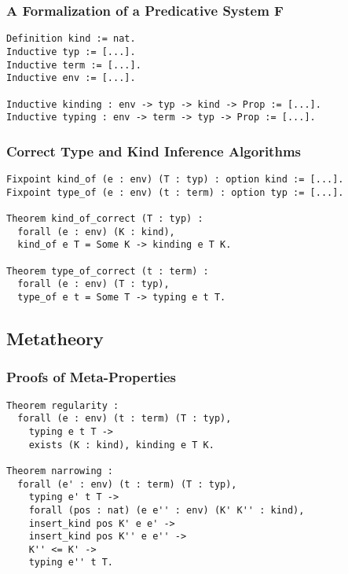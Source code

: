 \documentclass{beamer}
\begin{document}
\begin{frame}[fragile]

  \frametitle{A Formalization of a Predicative System F}

\begin{verbatim}
Definition kind := nat.
Inductive typ := [...].
Inductive term := [...].
Inductive env := [...].

Inductive kinding : env -> typ -> kind -> Prop := [...].
Inductive typing : env -> term -> typ -> Prop := [...].
\end{verbatim}

\end{frame}

\begin{frame}[fragile]

\frametitle{Correct Type and Kind Inference Algorithms}

\begin{verbatim}
Fixpoint kind_of (e : env) (T : typ) : option kind := [...].
Fixpoint type_of (e : env) (t : term) : option typ := [...].

Theorem kind_of_correct (T : typ) :
  forall (e : env) (K : kind), 
  kind_of e T = Some K -> kinding e T K.

Theorem type_of_correct (t : term) : 
  forall (e : env) (T : typ), 
  type_of e t = Some T -> typing e t T.
\end{verbatim}

\end{frame}

\subsection{Metatheory}

\begin{frame}[fragile]

\frametitle{Proofs of Meta-Properties}

\begin{verbatim}
Theorem regularity :
  forall (e : env) (t : term) (T : typ),
    typing e t T ->
    exists (K : kind), kinding e T K.

Theorem narrowing :
  forall (e' : env) (t : term) (T : typ),
    typing e' t T ->
    forall (pos : nat) (e e'' : env) (K' K'' : kind),
    insert_kind pos K' e e' ->
    insert_kind pos K'' e e'' ->
    K'' <= K' ->
    typing e'' t T.
\end{verbatim}

\end{frame}
\end{document}
